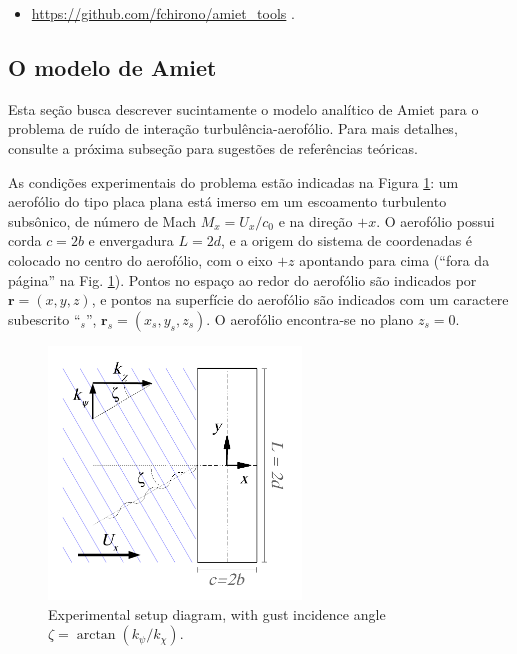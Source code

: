 \documentclass[a4paper, 11pt, twoside]{article}
\begin{document}
\begin{itemize}
	\item \url{https://github.com/fchirono/amiet_tools} .
\end{itemize}


\subsection{O modelo de Amiet}

Esta seção busca descrever sucintamente o modelo analítico de Amiet para o problema de ruído de interação turbulência-aerofólio. Para mais detalhes, consulte a próxima subseção para sugestões de referências teóricas.

As condições experimentais do problema estão indicadas na Figura \ref{fig:experimental_setup}: um aerofólio do tipo placa plana está imerso em um escoamento turbulento subsônico, de número de Mach $M_x = U_x/c_0$ e na direção $+x$. O aerofólio possui corda $c=2b$ e envergadura $L=2d$, e a origem do sistema de coordenadas é colocado no centro do aerofólio, com o eixo $+z$ apontando para cima (``fora da página'' na Fig. \ref{fig:experimental_setup}). Pontos no espaço ao redor do aerofólio são indicados por $\mathbf{r}=(x, y, z)$, e pontos na superfície do aerofólio são indicados com um caractere subescrito ``$_s$'', $\mathbf{r}_s = (x_s, y_s, z_s)$. O aerofólio encontra-se no plano $z_s = 0$.

\begin{figure}[htbp]
	\centering
	\includegraphics[width=0.6\textwidth]{../figures/Oblique_Gust_aerofoil.pdf}
	\caption{Experimental setup diagram, with gust incidence angle $\zeta = \arctan (k_\psi / k_\chi)$.}
	\label{fig:experimental_setup}
\end{figure}
\end{document}
